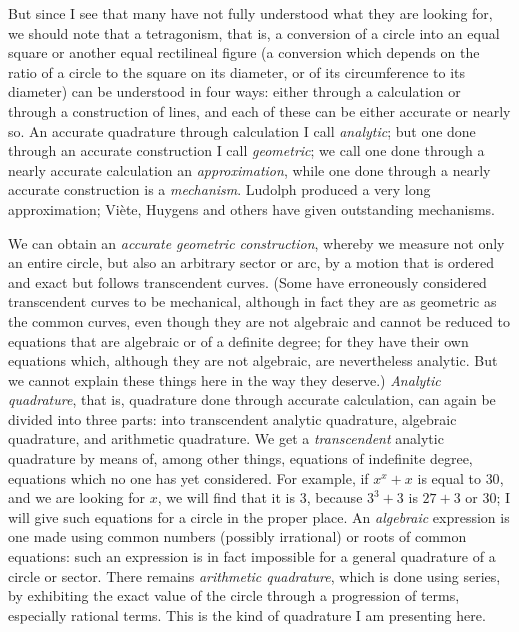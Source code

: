 \documentclass[polutonikogreek,english,twoside,openright]{article}
\begin{document}
But since I see that many have not fully understood what they are
looking for, we should note that a tetragonism, that is, a conversion
of a circle into an equal square or another equal rectilineal figure
(a conversion which depends on the ratio of a circle to the square on
its diameter, or of its circumference to its diameter) can be understood in four ways: either
through a calculation or through a construction of lines, and each of
these can be either accurate or nearly so.  An accurate quadrature
through calculation I call {\em analytic}; but one done through an
accurate construction I call {\em geometric}; we call one done through
a nearly accurate calculation an {\em approximation}, while one done
through a nearly accurate construction is a {\em mechanism}.  Ludolph
produced a very long approximation; Vi\`{e}te, Huygens and others have
given outstanding mechanisms.

We can obtain an {\em accurate geometric construction}, whereby we
measure not only an entire circle, but also an arbitrary sector or
arc, by a motion that is ordered and exact but follows
transcendent\label{accgeo} curves. (Some have erroneously considered transcendent
curves to be mechanical, although in fact they are as geometric as the
common curves, even though they are not algebraic and cannot be
reduced to equations that are algebraic or of a definite degree; for
they have their own equations which, although they are not algebraic,
are nevertheless analytic.  But we cannot explain these things here in
the way they deserve.)  {\em Analytic quadrature}, that is, quadrature
done through accurate calculation, can again be divided into three
parts: into transcendent analytic quadrature, algebraic quadrature,
and arithmetic quadrature.  We get a {\em transcendent} analytic
quadrature by means of, among other things, equations of indefinite
degree, equations which no one has yet considered.  For example, if
$x^x + x$ is equal to $30$, and we are looking for $x$, we will find
that it is 3, because $3^3 + 3$ is $27 + 3$ or $30$; I will give such
equations for a circle in the proper place.  An {\em algebraic}
expression is one made using common numbers (possibly irrational) or
roots of common equations: such an expression is in fact impossible
for a general quadrature of a circle or sector. There remains {\em arithmetic quadrature}, which
is done using series, by exhibiting the exact value of the circle
through a progression of terms, especially rational terms.  This is
the kind of quadrature I am presenting here.
\end{document}
